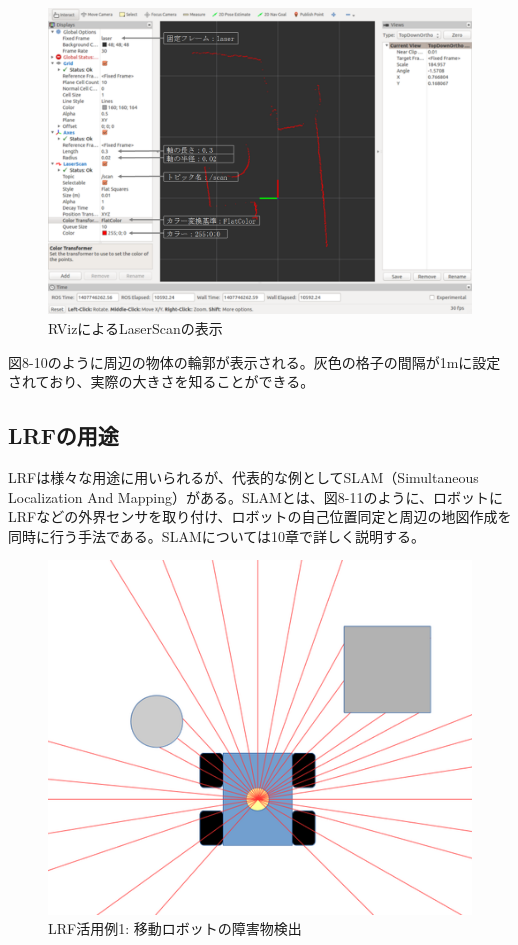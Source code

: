 \begin{figure}[htp]
  \centering
  \includegraphics[width=\columnwidth]{pictures/chapter8/pic_08_10.png}
  \caption{RVizによるLaserScanの表示}
\end{figure}

図8-10のように周辺の物体の輪郭が表示される。灰色の格子の間隔が1mに設定されており、実際の大きさを知ることができる。

\subsection{LRFの用途}

LRFは様々な用途に用いられるが、代表的な例としてSLAM（Simultaneous Localization And Mapping）がある。SLAMとは、図8-11のように、ロボットにLRFなどの外界センサを取り付け、ロボットの自己位置同定と周辺の地図作成を同時に行う手法である。SLAMについては10章で詳しく説明する。

\begin{figure}[htp]
  \centering
  \includegraphics[width=12cm]{pictures/chapter8/pic_08_11.png}
  \caption{LRF活用例1: 移動ロボットの障害物検出}
\end{figure}

